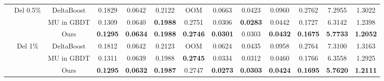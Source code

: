 \begin{table*}[t]
{\begin{tabular}{ccccccccccccc}
                                                                            & \multirow{3}{*}{Del 0.5\%} & DeltaBoost & 0.1829          & 0.0642          & 0.2122          & OOM             & 0.0663          & 0.0423          & 0.0960          & 0.2762          & 7.2955                                                               & 1.3022                                                                   \\
                                                                            &                        & MU in GBDT & 0.1309          & 0.0640          & \textbf{0.1988} & 0.2751          & 0.0306          & \textbf{0.0283} & 0.0442          & 0.1727          & 6.3142                                                               & 1.2398                                                                   \\
                                                                            &                        & Ours       & \textbf{0.1295} & \textbf{0.0634} & \textbf{0.1988} & \textbf{0.2746} & \textbf{0.0301} & 0.0303          & \textbf{0.0432} & \textbf{0.1675} & \textbf{5.7733}                                                      & \textbf{1.2052}                                                          \\\cline{2-13}
                                                                            & \multirow{3}{*}{Del 1\%}   & DeltaBoost & 0.1812          & 0.0642          & 0.2123          & OOM             & 0.0624          & 0.0435          & 0.0958          & 0.2764          & 7.3100                                                               & 1.3163                                                                   \\
                                                                            &                        & MU in GBDT & 0.1311          & 0.0639          & 0.1988          & \textbf{0.2745} & 0.0334          & 0.0312          & 0.0460          & 0.1766          & 6.3558                                                               & 1.2925                                                                   \\
                                                                            &                        & Ours       & \textbf{0.1295} & \textbf{0.0632} & \textbf{0.1987} & 0.2747          & \textbf{0.0273} & \textbf{0.0303} & \textbf{0.0424} & \textbf{0.1695} & \textbf{5.7620}                                                      & \textbf{1.2111}                                             \\
                                                                            \midrule
                                                                            \bottomrule
\end{tabular}%
}
\end{table*}